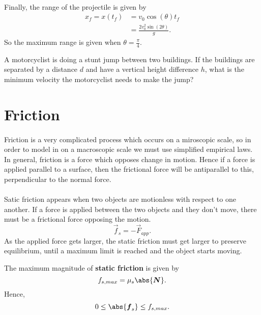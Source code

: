 \documentclass[../classical_mechanics.tex]{subfiles}
\begin{document}
        \paragraph{}
        Finally, the range of the projectile is given by
        \begin{align}
            x_f = x(t_f) &= v_0\cos(\theta)t_f\\
            &= \frac{2v_0^2\sin(2\theta)}{g}.
        \end{align}
        So the maximum range is given when $\theta=\frac{\pi}{4}$.


        \begin{example}
            A motorcyclist is doing a stunt jump between two buildings.
            If the buildings are separated by a distance $d$ and have a vertical height difference $h$, what is the minimum velocity the motorcyclist needs to make the jump?
        \end{example}

    \section{Friction}
        \paragraph{}
        Friction is a very complicated process which occurs on a miroscopic scale, so in order to model in on a macroscopic scale we must use simplified empirical laws.
        In general, friction is a force which opposes change in motion. Hence if a force is applied parallel to a surface, then the frictional force will be antiparallel to this, perpendicular to the normal force.

        \paragraph{}
        Satic friction appears when two objects are motionless with respect to one another.
        If a force is applied between the two objects and they don't move, there must be a frictional force opposing the motion.
        \begin{equation}
            \vec{f}_s=-\vec{F}_{app}.
        \end{equation}
        As the applied force gets larger, the static friction must get larger to preserve equilibrium, until a maximum limit is reached and the object starts moving.
        \begin{definition}
            The maximum magnitude of \textbf{static friction} is given by
            \begin{equation}
                f_{s,max}=\mu_s\abs{\vec{N}}.
            \end{equation}
            Hence,
            \begin{equation}
                0\leq\abs{\vec{f}_s}\leq f_{s,max}.
            \end{equation}
        \end{definition}
\end{document}
